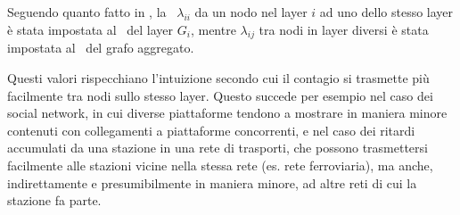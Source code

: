 Seguendo quanto fatto in \cite{basaras:infspmul}, la \epprob\ $\lambda_{ii}$ da un nodo nel 
layer $i$ ad uno dello stesso layer è stata impostata al \crepp\ del layer $G_i$, 
mentre $\lambda_{ij}$ tra nodi in layer diversi è stata impostata al \crepp\ del grafo 
aggregato. 

Questi valori rispecchiano l'intuizione secondo cui il contagio si trasmette 
più facilmente tra nodi sullo stesso layer. Questo succede per esempio nel caso dei social 
network, in cui diverse piattaforme tendono a mostrare in maniera minore contenuti con
collegamenti a piattaforme concorrenti, e nel caso dei ritardi accumulati da 
una stazione in una rete di trasporti, che possono trasmettersi facilmente alle stazioni vicine 
nella stessa rete (es. rete ferroviaria), ma anche, indirettamente e presumibilmente in maniera
minore, ad altre reti di cui la stazione fa parte.